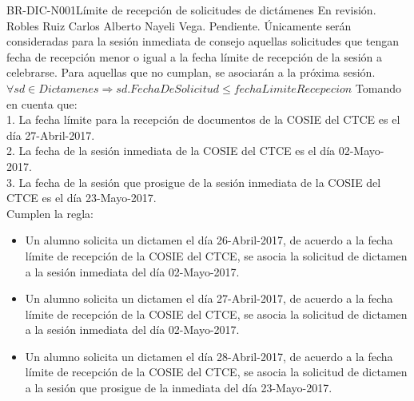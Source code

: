 %
%
%
%
\begin{BusinessRule}{BR-DIC-N001}{Límite de recepción de solicitudes de dictámenes}	%
	{\bcIntegridad}    %
	{\btEnabler}     %
	{\blControlling}    %
	\BRItem[Estado] En revisión.
	 Robles Ruiz Carlos Alberto
	 Nayeli Vega.
	 Pendiente.
	\BRItem[Descripción] Únicamente serán consideradas para la sesión inmediata de consejo aquellas solicitudes que tengan fecha de recepción menor o igual a la fecha límite de recepción de la sesión a celebrarse. Para aquellas que no cumplan, se asociarán a la próxima sesión.
	\BRItem[Sentencia] $ \forall sd \in Dictamenes \Rightarrow sd.FechaDeSolicitud \leq fechaLimiteRecepecion $
	\BRItem[Motivación] 
	Tomando en cuenta que:\\
			 1. La fecha límite para la recepción de documentos de la COSIE del CTCE es el día 27-Abril-2017.\\ 
			 2. La fecha de la sesión inmediata de la COSIE del CTCE es el día 02-Mayo-2017.\\
			 3. La fecha de la sesión que prosigue de la sesión inmediata de la COSIE del CTCE es el día 23-Mayo-2017.\\
	 Cumplen la regla:
	\begin{itemize}
		\item Un alumno solicita un dictamen el día 26-Abril-2017, de acuerdo a la fecha límite de recepción de la COSIE del CTCE, se asocia la solicitud de dictamen a la sesión inmediata del día 02-Mayo-2017.
		\item Un alumno solicita un dictamen el día 27-Abril-2017, de acuerdo a la fecha límite de recepción de la COSIE del CTCE, se asocia la solicitud de dictamen a la sesión inmediata del día 02-Mayo-2017.
		\item Un alumno solicita un dictamen el día 28-Abril-2017, de acuerdo a la fecha límite de recepción de la COSIE del CTCE, se asocia la solicitud de dictamen a la sesión que prosigue de la inmediata del día 23-Mayo-2017.

\end{itemize}
\end{BusinessRule}

